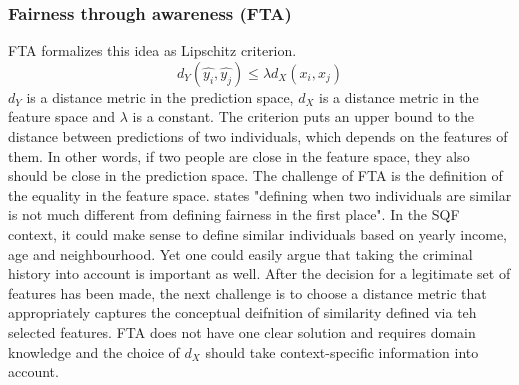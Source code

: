 \subsubsection*{Fairness through awareness (FTA)}
FTA formalizes this idea as Lipschitz criterion. $$d_Y(\hat{y_i}, \hat{y_j}) \leq \lambda {d_X}(x_i, x_j)$$
$d_Y$ is a distance metric in the prediction space, $d_X$ is a distance metric in the feature space and $\lambda$ is a constant.
The criterion puts an upper bound to the distance between predictions of two individuals, which depends on the features of them. In other words, if two people are close in the feature space, they also should be close in the prediction space. The challenge of FTA is the definition of the equality in the feature space. \cite{castelnovo2022} states "defining when two individuals are similar is not much different from defining fairness in the first place".
In the SQF context, it could make sense to define similar individuals based on yearly income, age and neighbourhood.
Yet one could easily argue that taking the criminal history into account is important as well. After the decision for a legitimate set of features has been made, the next challenge is to choose a distance metric that appropriately captures the conceptual deifnition of similarity defined via teh selected features.
FTA does not have one clear solution and requires domain knowledge and the choice of $d_X$ should take context-specific information into account.

